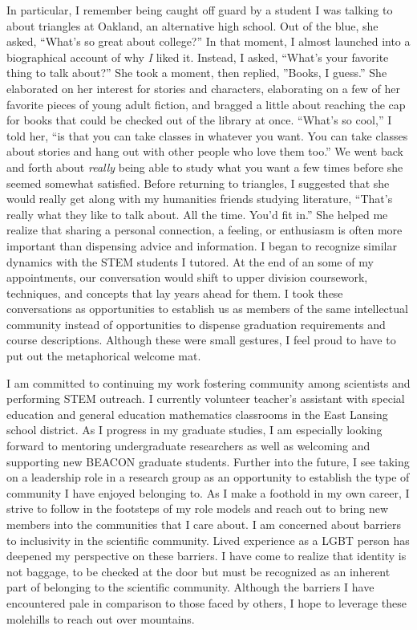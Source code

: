 In particular, I remember being caught off guard by a student I was talking to about triangles at Oakland, an alternative high school.
Out of the blue, she asked, ``What's so great about college?''
In that moment, I almost launched into a biographical account of why \textit{I} liked it.
Instead, I asked, ``What's your favorite thing to talk about?''
She took a moment, then replied, ''Books, I guess.''
She elaborated on her interest for stories and characters, elaborating on a few of her favorite pieces of young adult fiction, and bragged a little about reaching the cap for books that could be checked out of the library at once.
``What's so cool,'' I told her, ``is that you can take classes in whatever you want.
You can take classes about stories and hang out with other people who love them too.''
We went back and forth about \textit{really} being able to study what you want a few times before she seemed somewhat satisfied.
Before returning to triangles, I suggested that she would really get along with my humanities friends studying literature,
``That's really what they like to talk about.
All the time.
You'd fit in.''
She helped me realize that sharing a personal connection, a feeling, or enthusiasm is often more important than dispensing advice and information.
I began to recognize similar dynamics with the STEM students I tutored.
At the end of an some of my appointments, our conversation would shift to upper division coursework, techniques, and concepts that lay years ahead for them.
I took these conversations as opportunities to establish us as members of the same intellectual community instead of opportunities to dispense graduation requirements and course descriptions.
Although these were small gestures, I feel proud to have to put out the metaphorical welcome mat.

I am committed to continuing my work fostering community among scientists and performing STEM outreach.
I currently volunteer teacher's assistant with special education and general education mathematics classrooms in the East Lansing school district.
As I progress in my graduate studies, I am especially looking forward to mentoring undergraduate researchers as well as welcoming and supporting new BEACON graduate students.
Further into the future, I see taking on a leadership role in a research group as an opportunity to establish the type of community I have enjoyed belonging to.
As I make a foothold in my own career, I strive to follow in the footsteps of my role models and reach out to bring new members into the communities that I care about.
I am concerned about barriers to inclusivity in the scientific community.
Lived experience as a LGBT person has deepened my perspective on these barriers.
I have come to realize that identity is not baggage, to be checked at the door but must be recognized as an inherent part of belonging to the scientific community.
Although the barriers I have encountered pale in comparison to those faced by others, I hope to leverage these molehills to reach out over mountains.
